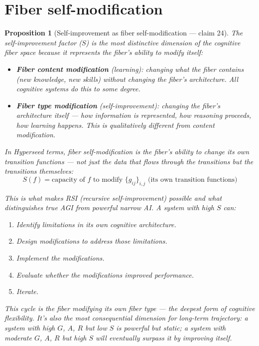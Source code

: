 \documentclass[11pt,a4paper]{article}
\newtheorem{proposition}[definition]{Proposition}
\begin{document}

\section{Fiber self-modification}
\label{sec:self-mod}

\begin{proposition}[Self-improvement as fiber self-modification --- claim 24]
\label{prop:self-mod}
The self-improvement factor ($S$) is the most distinctive dimension
of the cognitive fiber space because it represents the fiber's ability
to modify itself:
\begin{itemize}
\item \textbf{Fiber content modification} (learning): changing what
  the fiber contains (new knowledge, new skills) without changing
  the fiber's architecture. All cognitive systems do this to some
  degree.
\item \textbf{Fiber type modification} (self-improvement): changing
  the fiber's architecture itself --- how information is represented,
  how reasoning proceeds, how learning happens. This is qualitatively
  different from content modification.
\end{itemize}

In Hyperseed terms, fiber self-modification is the fiber's ability to
change its own transition functions --- not just the data that flows
through the transitions but the transitions themselves:
\[
  S(f) = \text{capacity of } f \text{ to modify }
  \{g_{ij}\}_{i,j} \text{ (its own transition functions)}
\]

This is what makes RSI (recursive self-improvement) possible and
what distinguishes true AGI from powerful narrow AI. A system with
high $S$ can:
\begin{enumerate}
\item Identify limitations in its own cognitive architecture.
\item Design modifications to address those limitations.
\item Implement the modifications.
\item Evaluate whether the modifications improved performance.
\item Iterate.
\end{enumerate}

This cycle is the fiber modifying its own fiber type --- the deepest
form of cognitive flexibility. It's also the most consequential
dimension for long-term trajectory: a system with high $G$, $A$, $R$
but low $S$ is powerful but static; a system with moderate $G$, $A$, $R$
but high $S$ will eventually surpass it by improving itself.
\end{proposition}
\end{document}
